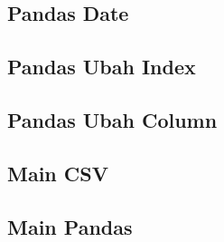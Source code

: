 \subsection{Pandas Date}

\subsection{Pandas Ubah Index}

\subsection{Pandas Ubah Column}

\subsection{Main CSV}

\subsection{Main Pandas}


